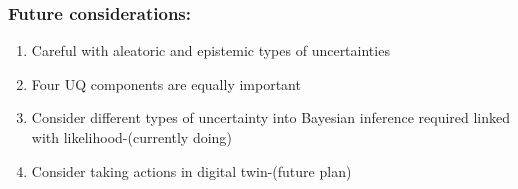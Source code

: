 \begin{frame}
\frametitle{Future considerations:}

\begin{enumerate}
\setlength\itemsep{1em}
    \item Careful with aleatoric and epistemic types of uncertainties
 
    \item Four UQ components are equally important

    \item Consider different types of uncertainty into Bayesian inference required linked with likelihood-(\alert{currently doing})

    \item Consider taking actions in digital twin-(\alert{future plan})
\end{enumerate}

    
\end{frame}





